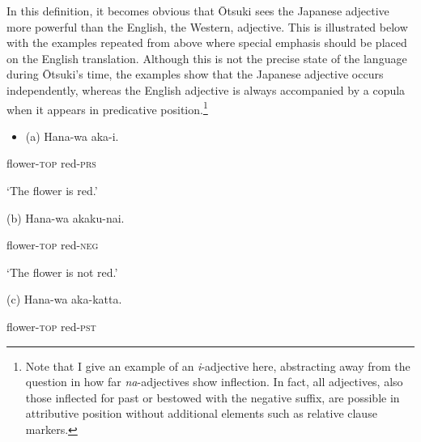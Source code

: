 \documentclass[output=paper]{langscibook}
\begin{document}
In this definition, it becomes obvious that Ōtsuki sees the Japanese adjective more powerful than the English, the Western, adjective. This is illustrated below with the examples repeated from above where special emphasis should be placed on the English translation. Although this is not the precise state of the language during Ōtsuki’s time, the examples show that the Japanese adjective occurs independently, whereas the English adjective is always accompanied by a copula when it appears in predicative position.\footnote{Note that I give an example of an \textit{i}{}-adjective here, abstracting away from the question in how far \textit{na}{}-adjectives show inflection. In fact, all adjectives, also those inflected for past or bestowed with the negative suffix, are possible in attributive position without additional elements such as relative clause markers.} 

\begin{itemize}
\item \begin{styleBeispielCinqueKapitel}
(a) Hana-wa aka-i.
\end{styleBeispielCinqueKapitel}
\end{itemize}
\begin{styleBeispielCinqueKapitel}
flower-\textsc{top} red-\textsc{prs}
\end{styleBeispielCinqueKapitel}

\begin{styleBeispielCinqueKapitel}
‘The flower is red.’ 
\end{styleBeispielCinqueKapitel}

\begin{styleBeispielCinqueKapitel}
(b) Hana-wa akaku-nai.
\end{styleBeispielCinqueKapitel}

\begin{styleBeispielCinqueKapitel}
flower-\textsc{top} red-\textsc{neg} 
\end{styleBeispielCinqueKapitel}

\begin{styleBeispielCinqueKapitel}
‘The flower is not red.’ 
\end{styleBeispielCinqueKapitel}

\begin{styleBeispielCinqueKapitel}
(c) Hana-wa aka-katta.
\end{styleBeispielCinqueKapitel}

\begin{styleBeispielCinqueKapitel}
flower-\textsc{top} red-\textsc{pst} 
\end{styleBeispielCinqueKapitel}
\end{document}
